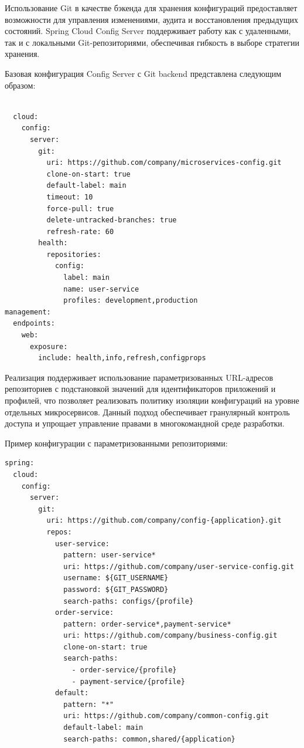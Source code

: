 Использование Git в качестве бэкенда для хранения конфигураций предоставляет возможности для управления изменениями, аудита и восстановления предыдущих состояний. Spring Cloud Config Server поддерживает работу как с удаленными, так и с локальными Git-репозиториями, обеспечивая гибкость в выборе стратегии хранения.

Базовая конфигурация Config Server с Git backend представлена следующим образом:

\begin{verbatim}

  cloud:
    config:
      server:
        git:
          uri: https://github.com/company/microservices-config.git
          clone-on-start: true
          default-label: main
          timeout: 10
          force-pull: true
          delete-untracked-branches: true
          refresh-rate: 60
        health:
          repositories:
            config:
              label: main
              name: user-service
              profiles: development,production
management:
  endpoints:
    web:
      exposure:
        include: health,info,refresh,configprops
\end{verbatim}

Реализация поддерживает использование параметризованных URL-адресов репозиториев с подстановкой значений для идентификаторов приложений и профилей, что позволяет реализовать политику изоляции конфигураций на уровне отдельных микросервисов. Данный подход обеспечивает гранулярный контроль доступа и упрощает управление правами в многокомандной среде разработки.

Пример конфигурации с параметризованными репозиториями:

\begin{verbatim}
spring:
  cloud:
    config:
      server:
        git:
          uri: https://github.com/company/config-{application}.git
          repos:
            user-service:
              pattern: user-service*
              uri: https://github.com/company/user-service-config.git
              username: ${GIT_USERNAME}
              password: ${GIT_PASSWORD}
              search-paths: configs/{profile}
            order-service:
              pattern: order-service*,payment-service*
              uri: https://github.com/company/business-config.git
              clone-on-start: true
              search-paths:
                - order-service/{profile}
                - payment-service/{profile}
            default:
              pattern: "*"
              uri: https://github.com/company/common-config.git
              default-label: main
              search-paths: common,shared/{application}
\end{verbatim}

